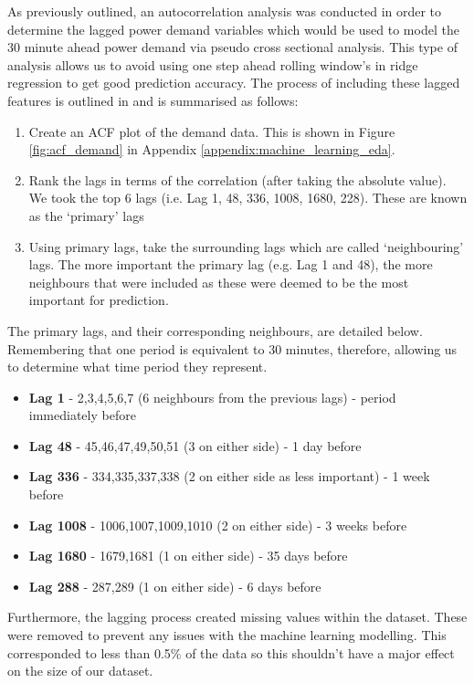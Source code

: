 \documentclass[11pt]{article}
\begin{document}
\label{section:lags}

As previously outlined, an autocorrelation analysis was conducted in order to determine the lagged power demand variables which would be used to model the 30 minute ahead power demand via pseudo cross sectional analysis. This type of analysis allows us to avoid using one step ahead rolling window's in ridge regression to get good prediction accuracy. The process of including these lagged features is outlined in \citet{kotillova_statistical_2012} and is summarised as follows:

\begin{enumerate}
\item Create an ACF plot of the demand data. This is shown in Figure \ref{fig:acf_demand} in Appendix \ref{appendix:machine_learning_eda}.
\item Rank the lags in terms of the correlation (after taking the absolute value). We took the top 6 lags (i.e. Lag 1, 48, 336, 1008, 1680, 228). These are known as the `primary' lags
\item Using primary lags, take the surrounding lags which are called `neighbouring' lags. The more important the primary lag (e.g. Lag 1 and 48), the more neighbours that were included as these were deemed to be the most important for prediction.
\end{enumerate}

\noindent The primary lags, and their corresponding neighbours, are detailed below. Remembering that one period is equivalent to 30 minutes, therefore, allowing us to determine what time period they represent.

\begin{itemize}
\item \textbf{Lag 1} - 2,3,4,5,6,7 (6 neighbours from the previous lags) - period immediately before
\item \textbf{Lag 48} - 45,46,47,49,50,51 (3 on either side) - 1 day before
\item \textbf{Lag 336} - 334,335,337,338 (2 on either side as less important) - 1 week before
\item \textbf{Lag 1008} - 1006,1007,1009,1010 (2 on either side) - 3 weeks before
\item \textbf{Lag 1680} - 1679,1681 (1 on either side) - 35 days before
\item  \textbf{Lag 288} - 287,289 (1 on either side) - 6 days before
\end{itemize}


\noindent Furthermore, the lagging process created missing values within the dataset. These were removed to prevent any issues with the machine learning modelling. This corresponded to less than 0.5\% of the data so this shouldn't have a major effect on the size of our dataset.
\end{document}
